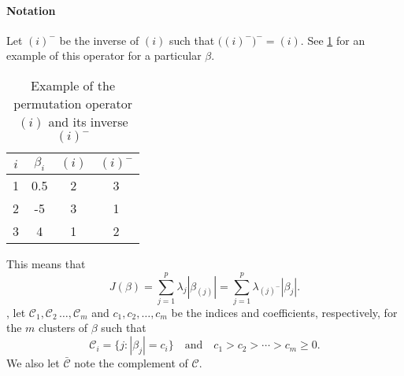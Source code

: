 \paragraph{Notation}\label{sec:notation}

Let \((i)^{-}\) be the inverse of \((i)\) such that
\(\big((i)^-\big)^- = (i)\). See \cref{tab:permutation-example} for an
example of this operator for a particular \(\beta\).
\begin{table}
  \centering
  \caption{Example of the permutation operator \((i)\) and its inverse
    \((i)^-\)\label{tab:permutation-example}}
  \begin{tabular}{cccc}
    \toprule
    \(i\) & \(\beta_i\) & \((i)\) & \((i)^-\) \\
    \midrule
    1     & 0.5       & 2              & 3                \\
    2     & -5        & 3              & 1                \\
    3     & 4         & 1              & 2                \\
    \bottomrule
  \end{tabular}
\end{table}
This means that
\[
  J(\beta) = \sum_{j=1}^p \lambda_j |\beta_{(j)}|
  = \sum_{j=1}^p \lambda_{(j)^-}|\beta_j|.
\]
, let \(\mathcal{C}_1, \mathcal{C}_2\, \dots, \mathcal{C}_m\) and \(c_1,
c_2, \dots, c_m\) be the indices and coefficients, respectively, for the \(m\)
clusters of $\beta$ such that
\[
  \mathcal{C}_i = \{j : |\beta_j| = c_i\} \quad \text{and} \quad
  c_1 > c_2 > \cdots > c_m \geq 0.
\]
We also let \(\bar{\mathcal{C}}\) note the complement of \(\mathcal{C}\).

